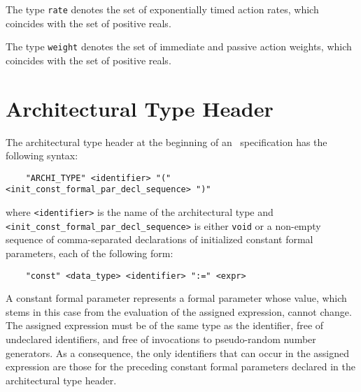 The type {\tt rate} denotes the set of exponentially timed action rates, which coincides with the set of
positive reals.

The type {\tt weight} denotes the set of immediate and passive action weights, which coincides with the set
of positive reals.



\section{Architectural Type Header}

The architectural type header at the beginning of an \aemilia\ specification has the following syntax:

	\begin{verbatim}
    "ARCHI_TYPE" <identifier> "(" <init_const_formal_par_decl_sequence> ")"
	\end{verbatim}

\noindent where {\tt <identifier>} is the name of the architectural type and
{\tt <init\_const\_formal\_par\_decl\_sequence>} is either {\tt void} or a non-empty sequence of
comma-separated declarations of initialized constant formal parameters, each of the following form:

	\begin{verbatim}
    "const" <data_type> <identifier> ":=" <expr>
	\end{verbatim}

A constant formal parameter represents a formal parameter whose value, which stems in this case from the
evaluation of the assigned expression, cannot change. The assigned expression must be of the same type as
the identifier, free of undeclared identifiers, and free of invocations to pseudo-random number generators.
As a consequence, the only identifiers that can occur in the assigned expression are those for the preceding
constant formal parameters declared in the architectural type header.



